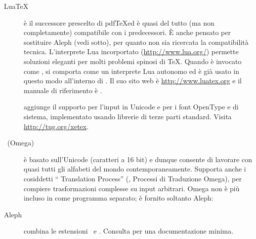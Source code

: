 \documentclass{article}
\begin{document}
\begin{description}
\item [Lua\TeX] è il successore prescelto di pdf\TeX ed è quasi del tutto
(ma non completamente) compatibile con i predecessori. È anche pensato per
sostituire Aleph (vedi sotto), per quanto non sia ricercata la
compatibilità tecnica. L'interprete Lua incorportato
(\url{http://www.lua.org/}) permette soluzioni eleganti per molti problemi
spinosi di \TeX. Quando è invocato come , si comporta
come un interprete Lua autonomo ed è già usato in questo modo all'interno
di \TL. Il suo sito web è \url{http://www.luatex.org} e il manuale di
riferimento è .

\item [\XeTeX] aggiunge il supporto per l'input in Unicode e per i font
OpenType e di sistema, implementato usando librerie di terze parti
standard. Visita \url{http://tug.org/xetex}.

\item [\OMEGA\ (Omega)] è basato sull'Unicode (caratteri a 16 bit) e
dunque consente di lavorare con quasi tutti gli alfabeti del mondo
contemporaneamente. Supporta anche i cosiddetti ``\OMEGA{} Translation
Process'' (, Processi di Traduzione Omega), per compiere
trasformazioni complesse su input arbitrari. Omega non è più incluso in
\TL{} come programma separato; è fornito soltanto Aleph:

\item [Aleph] combina le estensioni \OMEGA\ e \eTeX. Consulta
 per una documentazione minima.

\end{description}
\end{document}
